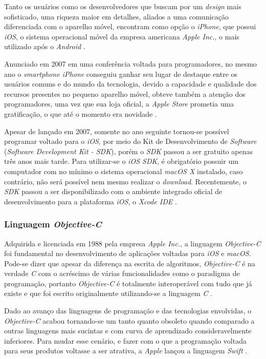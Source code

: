 Tanto os usuários como os desenvolvedores que buscam por um \textit{design} mais sofisticado, uma riqueza maior em detalhes, aliados a uma comunicação diferenciada com o aparelho móvel, encontram como opção o \textit{iPhone}, que possui \textit{iOS}, o sistema operacional móvel da empresa americana \textit{Apple Inc.}, o mais utilizado após o \textit{Android} \cite{Lecheta2016_IOS_&_IPAD}.

Anunciado em 2007 em uma conferência voltada para programadores, no mesmo ano o \textit{smartphone iPhone} conseguiu ganhar seu lugar de destaque entre os usuários comuns e do mundo da tecnologia, devido a capacidade e qualidade dos recursos presentes no pequeno aparelho móvel, obteve também a atenção dos programadores, uma vez que sua loja oficial, a \textit{Apple Store} prometia uma gratificação, o que até o momento era novidade \cite{Lecheta2016_IOS_&_IPAD}.

Apesar de lançado em 2007, somente no ano seguinte tornou-se possível programar voltado para o \textit{iOS}, por meio do Kit de Desenvolvimento de \textit{Software} (\textit{Software Development Kit - SDK}), porém o \textit{SDK} passou a ser gratuito apenas três anos mais tarde. Para utilizar-se o \textit{iOS SDK}, é obrigatório possuir um computador com no mínimo o sistema operacional \textit{macOS X} instalado, caso contrário, não será possível nem mesmo realizar o \textit{download}. Recentemente, o \textit{SDK }passou a ser disponibilizado com o ambiente integrado oficial de desenvolvimento para a plataforma \textit{iOS}, o \textit{Xcode IDE} \cite{Steil_IOS}.

\subsubsection{Linguagem \textit{Objective-C}}
Adquirida e licenciada em 1988 pela empresa \textit{Apple Inc.}, a linguagem 
\textit{Objective-C} foi fundamental no desenvolvimento de aplicações voltadas para \textit{iOS} e \textit{macOS}. Pode-se dizer que apesar da diferença na escrita de algoritmos, \textit{Objective-C} é na verdade \textit{C} com o acréscimo de várias funcionalidades como o paradigma de programação, portanto \textit{Objective-C} é totalmente interoperável com tudo que já existe e que foi escrito originalmente utilizando-se a linguagem \textit{C} \cite{Steil_IOS}.  

Dado ao avanço das linguagens de programação e das tecnologias envolvidas, o \textit{Objective-C} acabou tornando-se um tanto quanto obsoleto quando comparado a outras linguagens mais sucintas e com curva de aprendizado consideravelmente inferiores. Para mudar esse cenário, e fazer com o que a programação voltada para seus produtos voltasse a ser atrativa, a \textit{Apple} lançou a linguagem \textit{Swift} \cite{SwiftINFOQ2015}.

